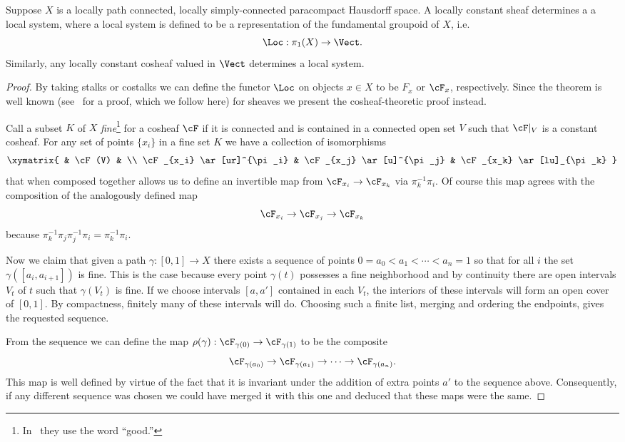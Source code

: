 \begin{thm}\label{thm:lc_sheaf_rep}
	Suppose $X$ is a locally path connected, locally simply-connected paracompact Hausdorff space. A locally constant sheaf determines a a local system, where a local system is defined to be a representation of the fundamental groupoid of $X$, i.e.
	\[
		\Loc: \pi_1(X) \to \Vect.
	\]
	Similarly, any locally constant cosheaf valued in $\Vect$ determines a local system.
\end{thm}
\begin{proof}
	By taking stalks or costalks we can define the functor $\Loc$ on objects $x\in X$ to be $F_x$ or $\cF_x$, respectively. Since the theorem is well known (see~\cite{achar-lsu} for a proof, which we follow here) for sheaves we present the cosheaf-theoretic proof instead.
	
	Call a subset $K$ of $X$ \emph{fine}\footnote{In~\cite{achar-lsu} they use the word ``good.''} for a cosheaf $\cF$ if it is connected and is contained in a connected open set $V$ such that $\cF|_V$ is a constant cosheaf. For any set of points $\{x_i\}$ in a fine set $K$ we have a collection of isomorphisms
	\[
	\xymatrix{ & \cF(V) & \\
	\cF_{x_i} \ar[ur]^{\pi_i} & \cF_{x_j} \ar[u]^{\pi_j} & \cF_{x_k} \ar[lu]_{\pi_k} }
	\]
	that when composed together allows us to define an invertible map from $\cF_{x_i}\to \cF_{x_k}$ via $\pi_{k}^{-1} \pi_i$. Of course this map agrees with the composition of the analogously defined map $$\cF_{x_i}\to \cF_{x_j} \to \cF_{x_k}$$ because $\pi_k^{-1}\pi_j\pi_j^{-1}\pi_i=\pi_{k}^{-1} \pi_i.$
	
	Now we claim that given a path $\gamma:[0,1]\to X$ there exists a sequence of points $0=a_0< a_1 < \cdots < a_n=1$ so that for all $i$ the set $\gamma([a_i,a_{i+1}])$ is fine. This is the case because every point $\gamma(t)$ possesses a fine neighborhood and by continuity there are open intervals $V_t$ of $t$ such that $\gamma(V_t)$ is fine. If we choose intervals $[a,a']$ contained in each $V_t$, the interiors of these intervals will form an open cover of $[0,1]$. By compactness, finitely many of these intervals will do. Choosing such a finite list, merging and ordering the endpoints, gives the requested sequence.
	
	From the sequence we can define the map $\rho(\gamma):\cF_{\gamma(0)}\to\cF_{\gamma(1)}$ to be the composite
	\[
		\cF_{\gamma(a_0)} \to \cF_{\gamma(a_1)} \to \cdots \to \cF_{\gamma(a_n)}.
	\]
	This map is well defined by virtue of the fact that it is invariant under the addition of extra points $a'$ to the sequence above. Consequently, if any different sequence was chosen we could have merged it with this one and deduced that these maps were the same.
	

\end{proof}
